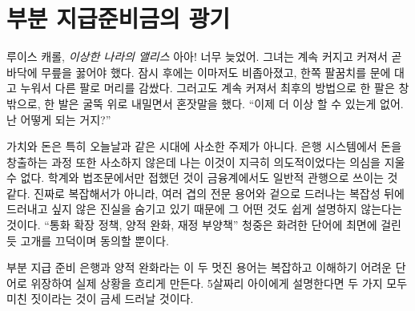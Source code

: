 \chapter{부분 지급준비금의 광기}
\label{les:13}

\begin{chapquote}{루이스 캐롤, \textit{이상한 나라의 앨리스}}
	아아! 너무 늦었어. 그녀는 계속 커지고 커져서 곧 바닥에 무릎을 꿇어야 했다.
	잠시 후에는 이마저도 비좁아졌고, 한쪽 팔꿈치를 문에 대고 누워서 다른 팔로 머리를 감쌌다.
	그러고도 계속 커져서 최후의 방법으로 한 팔은 창 밖으로, 한 발은 굴뚝 위로 내밀면서
	혼잣말을 했다. \enquote{이제 더 이상 할 수 있는게 없어. 난 어떻게 되는 거지?}
\end{chapquote}

\begin{comment}
	Value and money aren't trivial topics, especially in today's times. The
	process of money creation in our banking system is equally non-trivial,
	and I can't shake the feeling that this is deliberately so. What I have
	previously only encountered in academia and legal texts seems to be
	common practice in the financial world as well: nothing is explained in
	simple terms, not because it is truly complex, but because the truth is
	hidden behind layers and layers of jargon and \textit{apparent} complexity.
	\enquote{Expansionary monetary policy, quantitative easing, fiscal stimulus to
		the economy.} The audience nods along in agreement, hypnotized by the
	fancy words.
\end{comment}
가치와 돈은 특히 오늘날과 같은 시대에 사소한 주제가 아니다. 
은행 시스템에서 돈을 창출하는 과정 또한 사소하지 않은데 나는 이것이 지극히 의도적이었다는 의심을 지울 수 없다. 
학계와 법조문에서만 접했던 것이 금융계에서도 일반적 관행으로 쓰이는 것 같다.
진짜로 복잡해서가 아니라, 여러 겹의 전문 용어와 겉으로 드러나는 복잡성 뒤에 드러내고 싶지 않은 진실을 숨기고 있기 때문에 그 어떤 것도 쉽게 설명하지 않는다는 것이다.
\enquote{통화 확장 정책, 양적 완화, 재정 부양책} 
청중은 화려한 단어에 최면에 걸린 듯 고개를 끄덕이며 동의할 뿐이다.

\begin{comment}
	Fractional reserve banking and quantitative easing are two of those
	fancy words, obfuscating what is really happening by masking it as
	complex and difficult to understand. If you would explain them to a
	five-year-old, the insanity of both will become apparent quickly.
\end{comment}
부분 지급 준비 은행과 양적 완화라는 이 두 멋진 용어는 
복잡하고 이해하기 어려운 단어로 위장하여 실제 상황을 흐리게 만든다. 
5살짜리 아이에게 설명한다면 두 가지 모두 미친 짓이라는 것이 금세 드러날 것이다.


